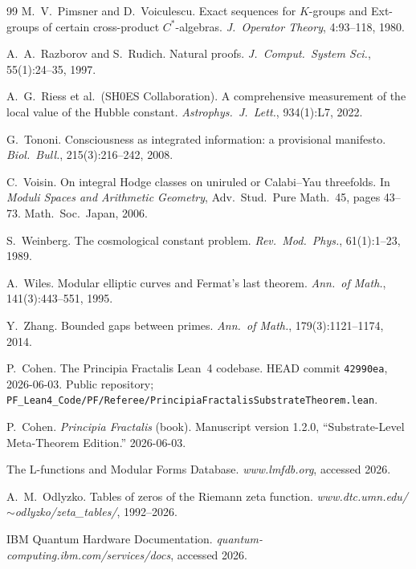 \documentclass[11pt,a4paper]{article}
\theoremstyle{definition}
\theoremstyle{remark}
\begin{document}
\begin{thebibliography}{99}
M.\ V.\ Pimsner and D.\ Voiculescu.
\newblock Exact sequences for $K$-groups and Ext-groups of certain
cross-product $C^{*}$-algebras.
\newblock \emph{J.\ Operator Theory}, 4:93--118, 1980.

A.\ A.\ Razborov and S.\ Rudich.
\newblock Natural proofs.
\newblock \emph{J.\ Comput.\ System Sci.}, 55(1):24--35, 1997.

A.\ G.\ Riess et al.\ (SH0ES Collaboration).
\newblock A comprehensive measurement of the local value of the
Hubble constant.
\newblock \emph{Astrophys.\ J.\ Lett.}, 934(1):L7, 2022.

G.\ Tononi.
\newblock Consciousness as integrated information: a provisional
manifesto.
\newblock \emph{Biol.\ Bull.}, 215(3):216--242, 2008.

C.\ Voisin.
\newblock On integral Hodge classes on uniruled or Calabi--Yau
threefolds.
\newblock In \emph{Moduli Spaces and Arithmetic Geometry}, Adv.\
Stud.\ Pure Math.\ 45, pages 43--73. Math.\ Soc.\ Japan, 2006.

S.\ Weinberg.
\newblock The cosmological constant problem.
\newblock \emph{Rev.\ Mod.\ Phys.}, 61(1):1--23, 1989.

A.\ Wiles.
\newblock Modular elliptic curves and Fermat's last theorem.
\newblock \emph{Ann.\ of Math.}, 141(3):443--551, 1995.

Y.\ Zhang.
\newblock Bounded gaps between primes.
\newblock \emph{Ann.\ of Math.}, 179(3):1121--1174, 2014.

P.\ Cohen.
\newblock The Principia Fractalis Lean~4 codebase.
\newblock HEAD commit \texttt{42990ea}, 2026-06-03.
\newblock Public repository; \texttt{PF\_Lean4\_Code/PF/Referee/PrincipiaFractalisSubstrateTheorem.lean}.

P.\ Cohen.
\newblock \emph{Principia Fractalis} (book).
\newblock Manuscript version 1.2.0, ``Substrate-Level Meta-Theorem
Edition.'' 2026-06-03.

The L-functions and Modular Forms Database.
\newblock \emph{www.lmfdb.org}, accessed 2026.

A.\ M.\ Odlyzko.
\newblock Tables of zeros of the Riemann zeta function.
\newblock \emph{www.dtc.umn.edu/$\sim$odlyzko/zeta\_tables/}, 1992--2026.

IBM Quantum Hardware Documentation.
\newblock \emph{quantum-computing.ibm.com/services/docs}, accessed 2026.


\end{thebibliography}
\end{document}
